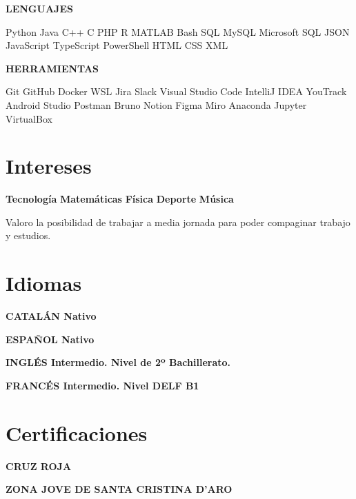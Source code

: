 \documentclass[11pt,a4paper]{article}
\newcommand{\runsubsection}[1]{\color{subheadings}\fontsize{12pt}{12pt}\selectfont\bfseries\uppercase{#1}\normalfont}
\newcommand{\descript}[1]{\color{subheadings}\raggedright\scshape\fontsize{11pt}{13pt}\selectfont{#1 \\}\normalfont}
\newcommand{\location}[1]{\color{headings}\raggedright\fontsize{10pt}{12pt}\selectfont{#1\\}\normalfont}
\newcommand{\sectionsep}{\vspace{8pt}}
\begin{document}
\begin{multicols}{2}
\runsubsection{Lenguajes}

Python \textbullet{} Java \textbullet{} C++ \textbullet{} C \textbullet{} PHP \textbullet{} R \textbullet{} MATLAB \textbullet{} Bash \textbullet{} SQL \textbullet{} MySQL \textbullet{} Microsoft SQL \textbullet{} JSON \textbullet{} JavaScript \textbullet{} TypeScript \textbullet{} PowerShell \textbullet{} HTML \textbullet{} CSS \textbullet{} XML
\sectionsep

\runsubsection{Herramientas}

Git \textbullet{} GitHub \textbullet{} Docker \textbullet{} WSL \textbullet{} Jira \textbullet{} Slack \textbullet{} Visual Studio Code \textbullet{} IntelliJ IDEA \textbullet{} YouTrack \textbullet{} Android Studio \textbullet{} Postman \textbullet{} Bruno \textbullet{} Notion \textbullet{} Figma \textbullet{} Miro \textbullet{} Anaconda \textbullet{} Jupyter \textbullet{} VirtualBox
\sectionsep

\section{Intereses}
\textbf{Tecnología} \textbullet{} \textbf{Matemáticas} \textbullet{} \textbf{Física} \textbullet{} \textbf{Deporte} \textbullet{} \textbf{Música}

Valoro la posibilidad de trabajar a media jornada para poder compaginar trabajo y estudios.

\section{Idiomas}

\runsubsection{Catalán}
Nativo
\sectionsep

\runsubsection{Español}
Nativo
\sectionsep

\runsubsection{Inglés}
Intermedio. Nivel de 2º Bachillerato.
\sectionsep

\runsubsection{Francés}
Intermedio. Nivel DELF B1
\sectionsep

\section{Certificaciones}

\runsubsection{Cruz Roja}

\descript{Curso de primeros auxilios}
\location{2019 | Santa Cristina d'Aro}
\sectionsep

\runsubsection{Zona Jove de Santa Cristina d'Aro}

\descript{Curso de manipulación de alimentos}
\location{2019 | Santa Cristina d'Aro}
\sectionsep


\end{multicols}
\end{document}
